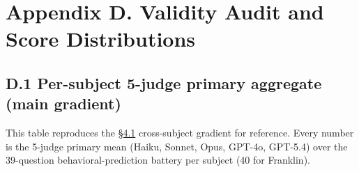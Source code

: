 \hypertarget{appendix-d.-validity-audit-and-score-distributions}{%
\section{Appendix D. Validity Audit and Score
Distributions}\label{appendix-d.-validity-audit-and-score-distributions}}

\hypertarget{d.1-per-subject-5-judge-primary-aggregate-main-gradient}{%
\subsection{D.1 Per-subject 5-judge primary aggregate (main
gradient)}\label{d.1-per-subject-5-judge-primary-aggregate-main-gradient}}

This table reproduces the \hyperref[the-cross-subject-gradient-and-its-per-question-mechanism]{§4.1} cross-subject gradient for reference.
Every number is the 5-judge primary mean (Haiku, Sonnet, Opus, GPT-4o,
GPT-5.4) over the 39-question behavioral-prediction battery per subject
(40 for Franklin).

